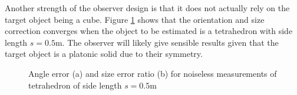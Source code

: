 Another strength of the observer design is that it does not actually rely on the target object being a cube. Figure \ref{fig:tetrahedron} shows that the orientation and size correction converges when the object to be estimated is a tetrahedron with side length $s = 0.5$m. The observer will likely give sensible results given that the target object is a platonic solid due to their symmetry. 
\begin{figure}
\centering
 	\caption{Angle error (a) and size error ratio (b) for noiseless measurements of tetrahedron of side length $s = 0.5$m}
 	\label{fig:tetrahedron}
\end{figure}

